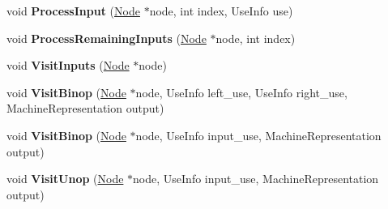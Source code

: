 \begin{DoxyCompactItemize}
\item 
void {\bfseries Process\+Input} (\hyperlink{classv8_1_1internal_1_1compiler_1_1_node}{Node} $\ast$node, int index, Use\+Info use)\hypertarget{classv8_1_1internal_1_1compiler_1_1_representation_selector_ac8d63d9bd87a3c590e6e62da7492e655}{}\label{classv8_1_1internal_1_1compiler_1_1_representation_selector_ac8d63d9bd87a3c590e6e62da7492e655}

\item 
void {\bfseries Process\+Remaining\+Inputs} (\hyperlink{classv8_1_1internal_1_1compiler_1_1_node}{Node} $\ast$node, int index)\hypertarget{classv8_1_1internal_1_1compiler_1_1_representation_selector_a0a7d6bffe757ca2903453df5dad19ecb}{}\label{classv8_1_1internal_1_1compiler_1_1_representation_selector_a0a7d6bffe757ca2903453df5dad19ecb}

\item 
void {\bfseries Visit\+Inputs} (\hyperlink{classv8_1_1internal_1_1compiler_1_1_node}{Node} $\ast$node)\hypertarget{classv8_1_1internal_1_1compiler_1_1_representation_selector_a9cfa3a67487287572002fe1a34f28a2c}{}\label{classv8_1_1internal_1_1compiler_1_1_representation_selector_a9cfa3a67487287572002fe1a34f28a2c}

\item 
void {\bfseries Visit\+Binop} (\hyperlink{classv8_1_1internal_1_1compiler_1_1_node}{Node} $\ast$node, Use\+Info left\+\_\+use, Use\+Info right\+\_\+use, Machine\+Representation output)\hypertarget{classv8_1_1internal_1_1compiler_1_1_representation_selector_a6f3c3c86e2f48cd9dda1125ee2dd8186}{}\label{classv8_1_1internal_1_1compiler_1_1_representation_selector_a6f3c3c86e2f48cd9dda1125ee2dd8186}

\item 
void {\bfseries Visit\+Binop} (\hyperlink{classv8_1_1internal_1_1compiler_1_1_node}{Node} $\ast$node, Use\+Info input\+\_\+use, Machine\+Representation output)\hypertarget{classv8_1_1internal_1_1compiler_1_1_representation_selector_a27a711a02c02737e074562c45af56f78}{}\label{classv8_1_1internal_1_1compiler_1_1_representation_selector_a27a711a02c02737e074562c45af56f78}

\item 
void {\bfseries Visit\+Unop} (\hyperlink{classv8_1_1internal_1_1compiler_1_1_node}{Node} $\ast$node, Use\+Info input\+\_\+use, Machine\+Representation output)\hypertarget{classv8_1_1internal_1_1compiler_1_1_representation_selector_a74416026474e0a0da9cb91ea0f84656f}{}\label{classv8_1_1internal_1_1compiler_1_1_representation_selector_a74416026474e0a0da9cb91ea0f84656f}


\end{DoxyCompactItemize}
